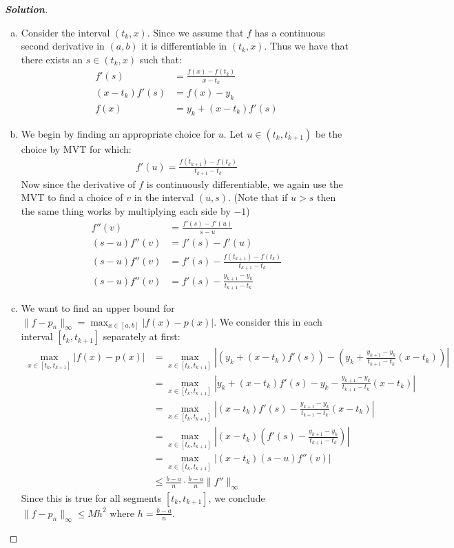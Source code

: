 \documentclass[11pt]{article}
\newenvironment{solution}{%
  \begin{proof}[\textbf{Solution}]$ $\par\nobreak\ignorespaces
}{%
  \end{proof}
}
\theoremstyle{definition}
\begin{document}
\begin{solution}
\begin{enumerate}[(a)]
    \item Consider the interval $(t_k, x)$. Since we assume that $f$ has a continuous second derivative in $(a, b)$ it is differentiable in $(t_k, x)$. Thus we have that there exists an $s \in (t_k, x)$ such that:
    \begin{align*}
        f'(s) &= \frac{f(x) - f(t_k)}{x - t_k} \\
        (x - t_k)f'(s) &= f(x) - y_k \\
        f(x) &= y_k + (x - t_k)f'(s)
    \end{align*}
    \item We begin by finding an appropriate choice for $u$. Let $u \in (t_k, t_{k+1})$ be the choice by MVT for which:
    \begin{align*}
        f'(u) = \frac{f(t_{k+1}) - f(t_k)}{t_{k+1} - t_k}
    \end{align*}
    Now since the derivative of $f$ is continuously differentiable, we again use the MVT to find a choice of $v$ in the interval $(u, s)$. (Note that if $u > s$ then the same thing works by multiplying each side by $-1$)
    \begin{align*}
        f''(v) &= \frac{f'(s) - f'(u)}{s - u} \\
        (s - u)f''(v) &= f'(s) - f'(u) \\
        (s - u)f''(v) &= f'(s) - \frac{f(t_{k+1}) - f(t_k)}{t_{k+1} - t_k} \\
        (s - u)f''(v) &= f'(s) - \frac{y_{k+1} - y_k}{t_{k+1} - t_k}
    \end{align*}
    \item We want to find an upper bound for $\|f - p_n\|_\infty = \max_{x \in [a, b]}|f(x) - p(x)|$. We consider this in each interval $[t_k, t_{k+1}]$ separately at first:
    \begin{align*}
        \max_{x \in [t_k, t_{k+1}]}|f(x) - p(x)| &= \max_{x \in [t_k, t_{k+1}]}\left|\left(y_k + (x - t_k)f'(s)\right) - \left(y_k + \frac{y_{k+1} - y_k}{t_{k+1} - t_k}(x - t_k)\right)\right| \\
        &= \max_{x \in [t_k, t_{k+1}]}\left|y_k + (x - t_k)f'(s) - y_k - \frac{y_{k+1} - y_k}{t_{k+1} - t_k}(x - t_k)\right| \\
        &= \max_{x \in [t_k, t_{k+1}]}\left|(x - t_k)f'(s) - \frac{y_{k+1} - y_k}{t_{k+1} - t_k}(x - t_k)\right| \\
        &= \max_{x \in [t_k, t_{k+1}]}\left|(x - t_k)\left(f'(s) - \frac{y_{k+1} - y_k}{t_{k+1} - t_k}\right)\right| \\
        &= \max_{x \in [t_k, t_{k+1}]}\left|(x - t_k)(s - u)f''(v)\right| \\
        &\leq \frac{b - a}{n} \cdot \frac{b - a}{n} \|f''\|_\infty
    \end{align*}
    Since this is true for all segments $[t_k, t_{k+1}]$, we conclude $\|f - p_n\|_\infty \leq Mh^2$ where $h = \frac{b - a}{n}$.
\end{enumerate}
\end{solution}
\end{document}

